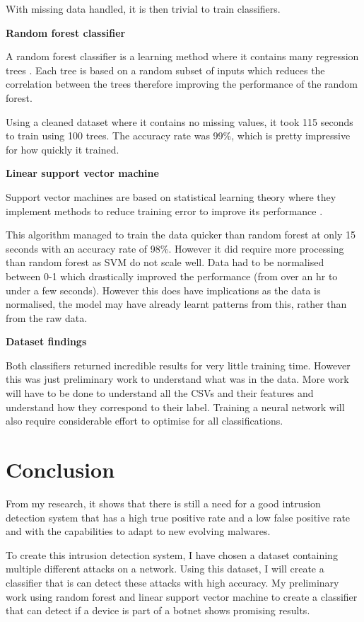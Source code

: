 \documentclass[11pt]{article}
\begin{document}
With missing data handled, it is then trivial to train classifiers.

\textbf{Random forest classifier}

A random forest classifier is a learning method where it contains many regression trees \cite{initial-analysis-rf}. Each tree is based on a random subset of inputs which reduces the correlation between the trees therefore improving the performance of the random forest. 

Using a cleaned dataset where it contains no missing values, it took 115 seconds to train using 100 trees. The accuracy rate was 99\%, which is pretty impressive for how quickly it trained. 

\textbf{Linear support vector machine}  

Support vector machines are based on statistical learning theory where they implement methods to reduce training error to improve its performance \cite{initial-analysis-svm}. 

This algorithm managed to train the data quicker than random forest at only 15 seconds with an accuracy rate of 98\%. However it did require more processing than random forest as SVM do not scale well. Data had to be normalised between 0-1 which drastically improved the performance (from over an hr to under a few seconds). However this does have implications as the data is normalised, the model may have already learnt patterns from this, rather than from the raw data. 

\textbf{Dataset findings}

Both classifiers returned incredible results for very little training time. However this was just preliminary work to understand what was in the data. More work will have to be done to understand all the CSVs and their features and understand how they correspond to their label. Training a neural network will also require considerable effort to optimise for all classifications. 

\section{Conclusion}
From my research, it shows that there is still a need for a good intrusion detection system that has a high true positive rate and a low false positive rate and with the capabilities to adapt to new evolving malwares. 

To create this intrusion detection system, I have chosen a dataset containing multiple different attacks on a network. Using this dataset, I will create a classifier that is can detect these attacks with high accuracy. My preliminary work using random forest and linear support vector machine to create a classifier that can detect if a device is part of a botnet shows promising results. 
\end{document}

